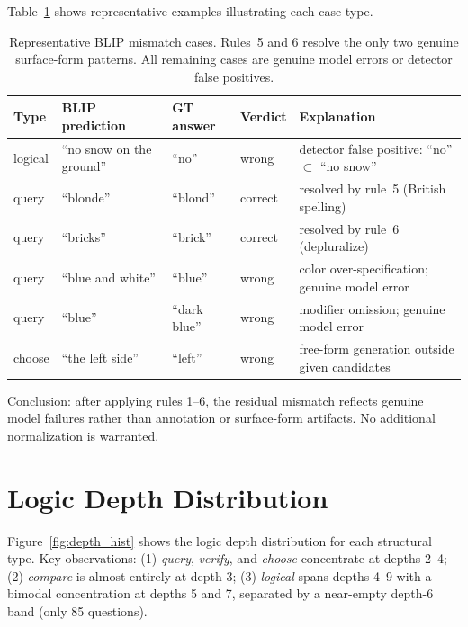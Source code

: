 \documentclass[11pt]{article}
\begin{document}
\noindent Table~\ref{tab:mismatch_examples} shows representative examples illustrating each case type.

\begin{table}[h]
\centering
\small
\renewcommand{\arraystretch}{1.2}
\begin{tabular}{p{1.5cm} p{3.2cm} p{1.5cm} p{1.3cm} p{3.5cm}}
\toprule
\textbf{Type} & \textbf{BLIP prediction} & \textbf{GT answer} & \textbf{Verdict} & \textbf{Explanation} \\
\midrule
logical  & ``no snow on the ground'' & ``no''    & wrong & detector false positive: ``no'' $\subset$ ``no snow'' \\
query    & ``blonde''                & ``blond'' & correct & resolved by rule~5 (British spelling) \\
query    & ``bricks''                & ``brick'' & correct & resolved by rule~6 (depluralize) \\
query    & ``blue and white''        & ``blue''  & wrong  & color over-specification; genuine model error \\
query    & ``blue''                  & ``dark blue'' & wrong & modifier omission; genuine model error \\
choose   & ``the left side''         & ``left''  & wrong  & free-form generation outside given candidates \\
\bottomrule
\end{tabular}
\caption{Representative BLIP mismatch cases. Rules~5 and 6 resolve the only two genuine surface-form patterns. All remaining cases are genuine model errors or detector false positives.}
\label{tab:mismatch_examples}
\end{table}

\noindent Conclusion: after applying rules 1--6, the residual mismatch reflects genuine model failures rather than annotation or surface-form artifacts. No additional normalization is warranted.

\section{Logic Depth Distribution}
\label{app:depth_dist}

Figure~\ref{fig:depth_hist} shows the logic depth distribution for each structural type. Key observations: (1) \textit{query}, \textit{verify}, and \textit{choose} concentrate at depths 2--4; (2) \textit{compare} is almost entirely at depth 3; (3) \textit{logical} spans depths 4--9 with a bimodal concentration at depths 5 and 7, separated by a near-empty depth-6 band (only 85 questions).
\end{document}
